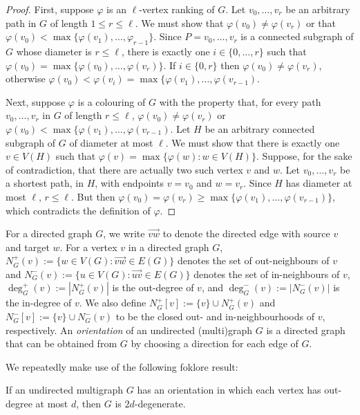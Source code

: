 \documentclass{patmorin}
\newcommand{\defin}[1]{\emph{\color{brightmaroon}#1}}
\begin{document}
\begin{proof}
  First, suppose $\varphi$ is an $\ell$-vertex ranking of $G$.  Let $v_0,\ldots,v_r$ be an arbitrary path in $G$ of length $1\le r\le \ell$.  We must show that $\varphi(v_0)\neq \varphi(v_r)$ or that $\varphi(v_0)<\max\{\varphi(v_1),\ldots,\varphi_{r-1}\}$.  Since $P=v_0,\ldots,v_r$ is a connected subgraph of $G$ whose diameter is $r\le\ell$,  there is exactly one $i\in\{0,\ldots,r\}$ such that $\varphi(v_0)=\max\{\varphi(v_0),\ldots,\varphi(v_r)\}$. If $i\in\{0,r\}$ then $\varphi(v_0)\neq\varphi(v_r)$, otherwise $\varphi(v_0)<\varphi(v_i)=\max\{\varphi(v_1),\ldots,\varphi(v_{r-1})$.

  Next, suppose $\varphi$ is a colouring of $G$ with the property that, for every path $v_0,\ldots,v_r$ in $G$ of length $r\le\ell$, $\varphi(v_0)\neq\varphi(v_r)$ or $\varphi(v_0)<\max\{\varphi(v_1),\ldots,\varphi(v_{r-1})$.  Let $H$ be an arbitrary connected subgraph of $G$ of diameter at most $\ell$.  We must show that there is exactly one $v\in V(H)$ such that $\varphi(v)=\max\{\varphi(w):w\in V(H)\}$.  Suppose, for the sake of contradiction, that there are actually two such vertex $v$ and $w$.  Let $v_0,\ldots,v_r$ be a shortest path, in $H$, with endpoints $v=v_0$ and $w=v_r$.  Since $H$ has diameter at most $\ell$, $r\le \ell$.  But then $\varphi(v_0)=\varphi(v_r)\ge\max\{\varphi(v_1),\ldots,\varphi(v_{r-1})\}$, which contradicts the definition of $\varphi$.
\end{proof}

For a directed graph $G$, we write $\overrightarrow{vw}$ to denote the directed edge with source $v$ and target $w$.  For a vertex $v$ in a directed graph $G$, $N^+_{G}(v):=\{w\in V(G):\overrightarrow{vw}\in E(G)\}$ denotes the set of out-neighbours of $v$ and $N^-_G(v):=\{u\in V(G):\overrightarrow{uv}\in E(G)\}$ denotes the set of in-neighbours of $v$, $\deg^+_{G}(v):=|N^+_G(v)|$ is the out-degree of $v$, and $\deg^-_{G}(v):=|N^-_G(v)|$ is the in-degree of $v$. We also define $N^+_{G}[v]:=\{v\}\cup N^+_{G}(v)$ and $N^-_{G}[v]:=\{v\}\cup N^-_{G}(v)$ to be the closed out- and in-neighbourhoods of $v$, respectively.
An \defin{orientation} of an undirected (multi)graph $G$ is a directed graph that can be obtained from $G$ by choosing a direction for each edge of $G$.

We repeatedly make use of the following foklore result:

\begin{obs}\label{orientation_to_degeneracy}
  If an undirected multigraph $G$ has an orientation in which each vertex has out-degree at most $d$, then $G$ is $2d$-degenerate.
\end{obs}
\end{document}
